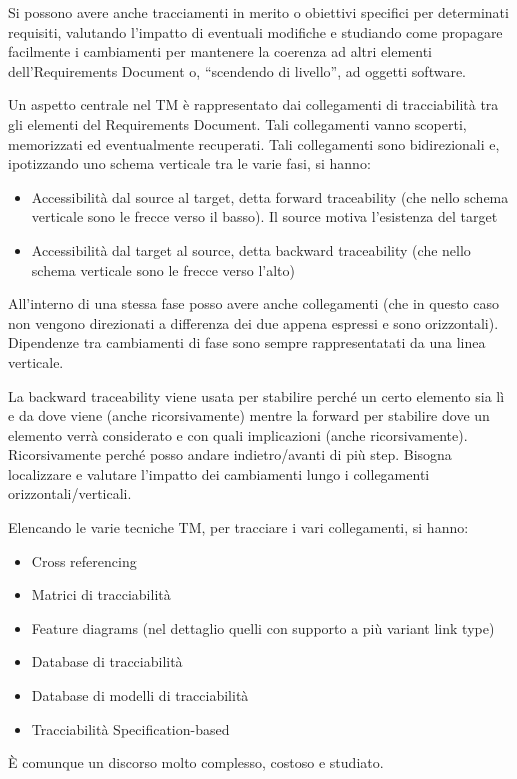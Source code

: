 Si possono avere anche tracciamenti in merito o obiettivi specifici per determinati requisiti, valutando l'impatto di eventuali modifiche e studiando come propagare facilmente i cambiamenti per mantenere la coerenza ad altri elementi dell'Requirements Document o, “scendendo di livello”, ad oggetti software.

Un aspetto centrale nel TM è rappresentato dai collegamenti di tracciabilità tra gli elementi del Requirements Document. Tali collegamenti vanno scoperti, memorizzati ed eventualmente recuperati. Tali collegamenti sono bidirezionali e, ipotizzando uno schema verticale tra le varie fasi, si hanno:
\begin{itemize}
    \item Accessibilità dal source al target, detta forward traceability (che nello schema verticale sono le frecce verso il basso). Il source motiva l'esistenza del target 
    \item Accessibilità dal target al source, detta backward traceability (che nello schema verticale sono le frecce verso l'alto)
\end{itemize}
All'interno di una stessa fase posso avere anche collegamenti (che in questo caso non vengono direzionati a differenza dei due appena espressi e sono orizzontali). Dipendenze tra cambiamenti di fase sono sempre rappresentatati da una linea verticale.

La backward traceability viene usata per stabilire perché un certo elemento sia lì e da dove viene (anche ricorsivamente) mentre la forward per stabilire dove un elemento verrà considerato e con quali implicazioni (anche ricorsivamente). Ricorsivamente perché posso andare indietro/avanti di più step. Bisogna localizzare e valutare l'impatto dei cambiamenti lungo i collegamenti orizzontali/verticali.

Elencando le varie tecniche TM, per tracciare i vari collegamenti, si hanno:
\begin{itemize}
    \item Cross referencing
    \item Matrici di tracciabilità
    \item Feature diagrams (nel dettaglio quelli con supporto a più variant link type)
    \item Database di tracciabilità
    \item Database di modelli di tracciabilità
    \item Tracciabilità Specification-based
\end{itemize}
È comunque un discorso molto complesso, costoso e studiato.

